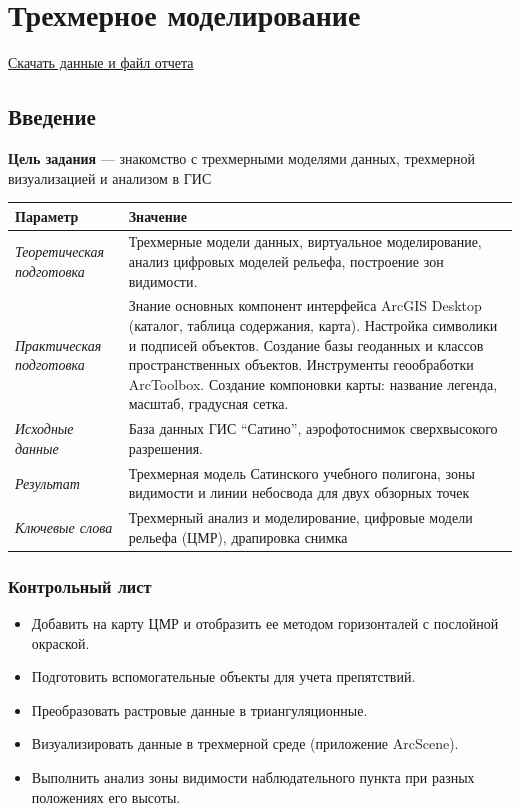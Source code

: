\documentclass[12pt,]{book}
\providecommand{\tightlist}{%
  \setlength{\itemsep}{0pt}\setlength{\parskip}{0pt}}
\begin{document}
\hypertarget{threed-modelling}{%
\chapter{Трехмерное моделирование}\label{threed-modelling}}

\href{http://autolab.geogr.msu.ru/gis/data/Ex18.zip}{Скачать данные и файл отчета}

\hypertarget{threed-modelling-intro}{%
\section{Введение}\label{threed-modelling-intro}}

\textbf{Цель задания} --- знакомство с трехмерными моделями данных, трехмерной визуализацией и анализом в ГИС

\begin{longtable}[]{@{}ll@{}}
\toprule
Параметр & Значение\tabularnewline
\midrule
\endhead
\emph{Теоретическая подготовка} & Трехмерные модели данных, виртуальное моделирование, анализ цифровых моделей рельефа, построение зон видимости.\tabularnewline
\emph{Практическая подготовка} & Знание основных компонент интерфейса ArcGIS Desktop (каталог, таблица содержания, карта). Настройка символики и подписей объектов. Создание базы геоданных и классов пространственных объектов. Инструменты геообработки ArcToolbox. Создание компоновки карты: название легенда, масштаб, градусная сетка.\tabularnewline
\emph{Исходные данные} & База данных ГИС ``Сатино'', аэрофотоснимок сверхвысокого разрешения.\tabularnewline
\emph{Результат} & Трехмерная модель Сатинского учебного полигона, зоны видимости и линии небосвода для двух обзорных точек\tabularnewline
\emph{Ключевые слова} & Трехмерный анализ и моделирование, цифровые модели рельефа (ЦМР), драпировка снимка\tabularnewline
\bottomrule
\end{longtable}

\hypertarget{threed-modelling-control}{%
\subsection{Контрольный лист}\label{threed-modelling-control}}

\begin{itemize}
\tightlist
\item
  Добавить на карту ЦМР и отобразить ее методом горизонталей с послойной окраской.
\item
  Подготовить вспомогательные объекты для учета препятствий.
\item
  Преобразовать растровые данные в триангуляционные.
\item
  Визуализировать данные в трехмерной среде (приложение ArcScene).
\item
  Выполнить анализ зоны видимости наблюдательного пункта при разных положениях его высоты.
\end{itemize}
\end{document}
